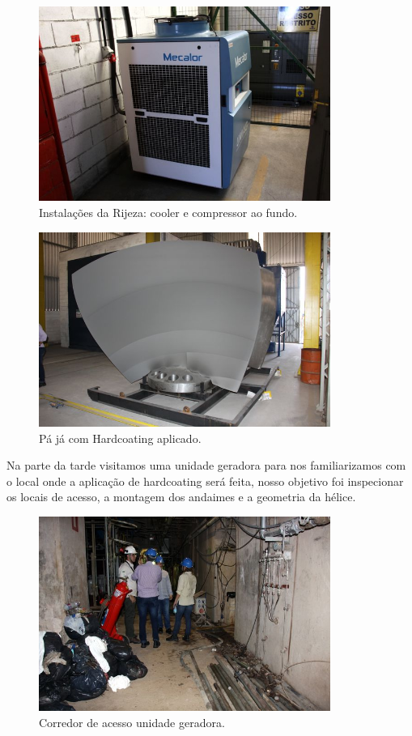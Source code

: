 \documentclass{article}
\begin{document}
\begin{figure}[H]
\centering
\includegraphics[width=0.85\textwidth]{Fotos/img_4852.jpg}
\caption{Instalações da Rijeza: cooler e compressor ao fundo.}
\end{figure}
\begin{figure}[H]
\centering
\includegraphics[width=0.85\textwidth]{Fotos/img_4886.jpg}
\caption{Pá já com Hardcoating aplicado.}
\end{figure}

Na parte da tarde visitamos uma unidade geradora para nos familiarizamos com o
local onde a aplicação de hardcoating será feita, nosso objetivo foi inspecionar
os locais de acesso, a montagem dos andaimes e a geometria da hélice.

\begin{figure}[H]
\centering
\includegraphics[width=0.85\textwidth]{Fotos/img_4905.jpg}
\caption{Corredor de acesso unidade geradora.}
\end{figure}
\end{document}
